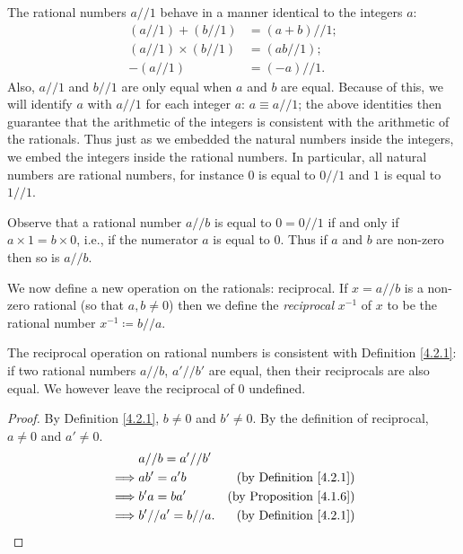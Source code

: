\begin{note}
The rational numbers \(a // 1\) behave in a manner identical to the integers \(a\):
\begin{align*}
    (a // 1) + (b // 1) &= (a + b) // 1; \\
    (a // 1) \times (b // 1) &= (ab // 1); \\
    -(a // 1) &= (-a) // 1.
\end{align*}
Also, \(a // 1\) and \(b // 1\) are only equal when \(a\) and \(b\) are equal.
Because of this, we will identify \(a\) with \(a // 1\) for each integer \(a\): \(a \equiv a // 1\);
the above identities then guarantee that the arithmetic of the integers is consistent with the arithmetic of the rationals.
Thus just as we embedded the natural numbers inside the integers, we embed the integers inside the rational numbers.
In particular, all natural numbers are rational numbers, for instance \(0\) is equal to \(0 // 1\) and \(1\) is equal to \(1 // 1\).
\end{note}

\begin{note}
Observe that a rational number \(a // b\) is equal to \(0 = 0 // 1\) if and only if \(a \times 1 = b \times 0\), i.e., if the numerator \(a\) is equal to \(0\).
Thus if \(a\) and \(b\) are non-zero then so is \(a // b\).
\end{note}

\begin{note}
We now define a new operation on the rationals: reciprocal.
If \(x = a // b\) is a non-zero rational (so that \(a, b \neq 0\)) then we define the \emph{reciprocal} \(x^{-1}\) of \(x\) to be the rational number \(x^{-1} \coloneqq b // a\).
\end{note}

\begin{additional corollary}\label{ac 4.2.2}
The reciprocal operation on rational numbers is consistent with Definition \ref{4.2.1}:
if two rational numbers \(a // b\), \(a' // b'\) are equal, then their reciprocals are also equal.
We however leave the reciprocal of \(0\) undefined.
\end{additional corollary}

\begin{proof}
By Definition \ref{4.2.1}, \(b \neq 0\) and \(b' \neq 0\).
By the definition of reciprocal, \(a \neq 0\) and \(a' \neq 0\).
\begin{align*}
& a // b = a' // b' \\
\implies & ab' = a'b & \text{(by Definition \ref{4.2.1})} \\
\implies & b'a = ba' & \text{(by Proposition \ref{4.1.6})} \\
\implies & b' // a' = b // a. & \text{(by Definition \ref{4.2.1})}
\end{align*}
\end{proof}

